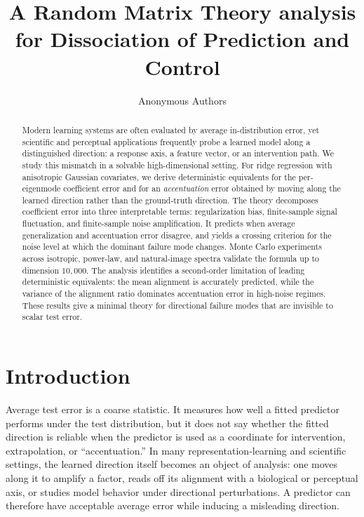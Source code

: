 \documentclass{article}
\title{A Random Matrix Theory analysis for Dissociation of Prediction and Control}
\author{Anonymous Authors}
\begin{document}
\maketitle

\begin{abstract}
Modern learning systems are often evaluated by average in-distribution error, yet scientific and perceptual applications frequently probe a learned model along a distinguished direction: a response axis, a feature vector, or an intervention path. We study this mismatch in a solvable high-dimensional setting. For ridge regression with anisotropic Gaussian covariates, we derive deterministic equivalents for the per-eigenmode coefficient error and for an \emph{accentuation} error obtained by moving along the learned direction rather than the ground-truth direction. The theory decomposes coefficient error into three interpretable terms: regularization bias, finite-sample signal fluctuation, and finite-sample noise amplification. It predicts when average generalization and accentuation error disagree, and yields a crossing criterion for the noise level at which the dominant failure mode changes. Monte Carlo experiments across isotropic, power-law, and natural-image spectra validate the formula up to dimension $10{,}000$. The analysis identifies a second-order limitation of leading deterministic equivalents: the mean alignment is accurately predicted, while the variance of the alignment ratio dominates accentuation error in high-noise regimes. These results give a minimal theory for directional failure modes that are invisible to scalar test error.
\end{abstract}

\section{Introduction}

Average test error is a coarse statistic. It measures how well a fitted predictor performs under the test distribution, but it does not say whether the fitted direction is reliable when the predictor is used as a coordinate for intervention, extrapolation, or ``accentuation.'' In many representation-learning and scientific settings, the learned direction itself becomes an object of analysis: one moves along it to amplify a factor, reads off its alignment with a biological or perceptual axis, or studies model behavior under directional perturbations. A predictor can therefore have acceptable average error while inducing a misleading direction.
\end{document}
